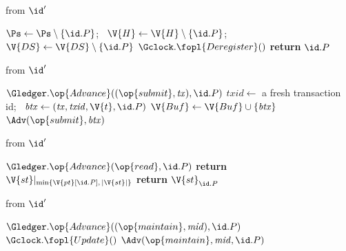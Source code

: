 \begin{interface}
{ \quad from $\id'$
\begin{algorithmic}[1]
\algcont
{}
\State $\Ps \gets \Ps \setminus \{\id.P\}$; \ $\V{H} \gets \V{H} \setminus \{\id.P\}$; \ $\V{DS} \gets \V{DS} \setminus \{\id.P\}$
  \State $\Gclock.\fopl{Deregister}()$
\EndIf
\State \textbf{return} $\id.P$
\algsave
\end{algorithmic}
\vspace{1.4ex}

 \quad from $\id'$
\begin{algorithmic}[1]
\algcont
{}
\State $\Gledger.\op{Advance}((\op{submit},\mathit{tx}), \id.P)$
\State $\mathit{txid} \gets$ a fresh transaction id; \ $\mathit{btx} \gets (\mathit{tx}, \mathit{txid}, \V{t}, \id.P)$
 \label{ln:gledadmit}
  \State $\V{Buf} \gets \V{Buf} \cup \{\mathit{btx}\}$
\EndIf
\State $\Adv(\op{submit}, \mathit{btx})$ \label{ln:gledleaktx}
\algsave
\end{algorithmic}
\vspace{1.4ex}

 \quad from $\id'$
\begin{algorithmic}[1]
\algcont
{}
\State $\Gledger.\op{Advance}(\op{read}, \id.P)$
  \State \textbf{return} $\V{st}|_{\min\{\V{pt}[\id.P], \, |\V{st}|\}}$ \label{ln:gledprefix}
\EndIf
\State \textbf{return} $\V{st}_{\id.P}$ \label{ln:gleddesyncread}
\algsave
\end{algorithmic}
\vspace{1.4ex}

 \quad from $\id'$
\begin{algorithmic}[1]
\algcont
{}
\State $\Gledger.\op{Advance}((\op{maintain},\mathit{mid}), \id.P)$
 \label{ln:gledpredict}
  \State $\Gclock.\fopl{Update}()$ \label{ln:gledtick}
\EndIf
{}
  \State $\Adv(\op{maintain}, \mathit{mid}, \id.P)$
\EndIf
\algsave
\end{algorithmic}
\vspace{1.4ex}

}
\end{interface}
